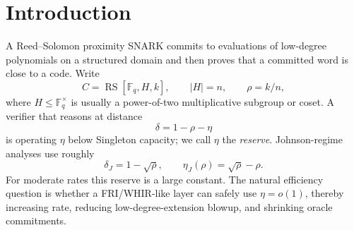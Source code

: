 \documentclass[11pt]{article}
\theoremstyle{definition}
\newcommand{\F}{\mathbb F}
\newcommand{\RS}{\operatorname{RS}}
\begin{document}
\begin{abstract}
This strengthened version adds a theorem-backed high-agreement ledger compiler: in the exact tangent range the line/CA/projective-line numerator is $r+1$, interleaved lists contribute the single numerator unit $1$, and finite power-curve branches contribute $d(r+1)$ in the split moving-root model.  These formulas give a concrete coding numerator certificate for the small-radius boundary layer while preserving the separation between protocol denominators, query/folding losses, and near-capacity local-limit assumptions.
\end{abstract}

\tableofcontents

\section{Introduction}
\label{sec:intro}

A Reed--Solomon proximity SNARK commits to evaluations of low-degree polynomials on a structured domain and then proves that a committed word is close to a code.  Write
\[
        C=\RS[\F_q,H,k],\qquad |H|=n,
        \qquad \rho=k/n,
\]
where $H\le \F_q^\times$ is usually a power-of-two multiplicative subgroup or coset.  A verifier that reasons at distance
\[
        \delta=1-\rho-\eta
\]
is operating $\eta$ below Singleton capacity; we call $\eta$ the \emph{reserve}.  Johnson-regime analyses \cite{Joh62,GS99,BCIKS20} use roughly
\[
        \delta_J=1-\sqrt\rho,
        \qquad
        \eta_J(\rho)=\sqrt\rho-\rho .
\]
For moderate rates this reserve is a large constant.  The natural efficiency question is whether a FRI/WHIR-like layer \cite{FRI,ACFY25} can safely use $\eta=o(1)$, thereby increasing rate, reducing low-degree-extension blowup, and shrinking oracle commitments.
\end{document}
